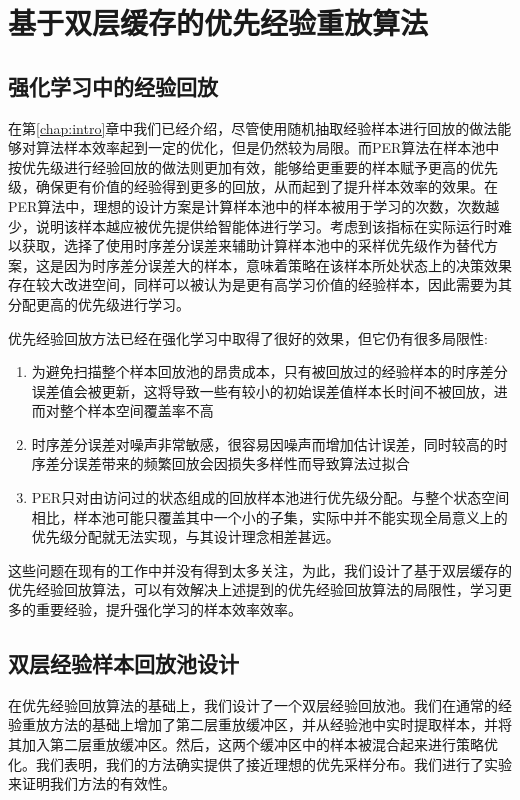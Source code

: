 
\chapter{基于双层缓存的优先经验重放算法}

\section{强化学习中的经验回放}

在第\ref{chap:intro}章中我们已经介绍，尽管使用随机抽取经验样本进行回放的做法能够对算法样本效率起到一定的优化，但是仍然较为局限。而PER算法在样本池中按优先级进行经验回放的做法则更加有效，能够给更重要的样本赋予更高的优先级，确保更有价值的经验得到更多的回放，从而起到了提升样本效率的效果。在PER算法中，理想的设计方案是计算样本池中的样本被用于学习的次数，次数越少，说明该样本越应被优先提供给智能体进行学习。考虑到该指标在实际运行时难以获取，选择了使用时序差分误差来辅助计算样本池中的采样优先级作为替代方案，这是因为时序差分误差大的样本，意味着策略在该样本所处状态上的决策效果存在较大改进空间，同样可以被认为是更有高学习价值的经验样本，因此需要为其分配更高的优先级进行学习。

优先经验回放方法已经在强化学习中取得了很好的效果，但它仍有很多局限性:

\begin{enumerate}
    \item 为避免扫描整个样本回放池的昂贵成本，只有被回放过的经验样本的时序差分误差值会被更新，这将导致一些有较小的初始误差值样本长时间不被回放，进而对整个样本空间覆盖率不高
    \item 时序差分误差对噪声非常敏感，很容易因噪声而增加估计误差，同时较高的时序差分误差带来的频繁回放会因损失多样性而导致算法过拟合
    \item PER只对由访问过的状态组成的回放样本池进行优先级分配。与整个状态空间相比，样本池可能只覆盖其中一个小的子集，实际中并不能实现全局意义上的优先级分配就无法实现，与其设计理念相差甚远。
\end{enumerate}

这些问题在现有的工作中并没有得到太多关注，为此，我们设计了基于双层缓存的优先经验回放算法，可以有效解决上述提到的优先经验回放算法的局限性，学习更多的重要经验，提升强化学习的样本效率效率。

\section{双层经验样本回放池设计}

在优先经验回放算法的基础上，我们设计了一个双层经验回放池。我们在通常的经验重放方法的基础上增加了第二层重放缓冲区，并从经验池中实时提取样本，并将其加入第二层重放缓冲区。然后，这两个缓冲区中的样本被混合起来进行策略优化。我们表明，我们的方法确实提供了接近理想的优先采样分布。我们进行了实验来证明我们方法的有效性。


